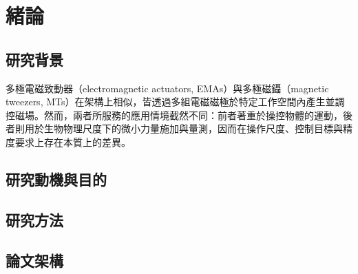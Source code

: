 \chapter{緒論}
\label{ch:intro}

\section{研究背景}
\label{sec:intro-background}

多極電磁致動器（electromagnetic actuators, EMAs）與多極磁鑷（magnetic tweezers, MTs）在架構上相似，皆透過多組電磁磁極於特定工作空間內產生並調控磁場。然而，兩者所服務的應用情境截然不同：前者著重於操控物體的運動，後者則用於生物物理尺度下的微小力量施加與量測，因而在操作尺度、控制目標與精度要求上存在本質上的差異。

\section{研究動機與目的}
\label{sec:intro-motivation}


\section{研究方法}
\label{sec:intro-method}


\section{論文架構}
\label{sec:intro-outline}

